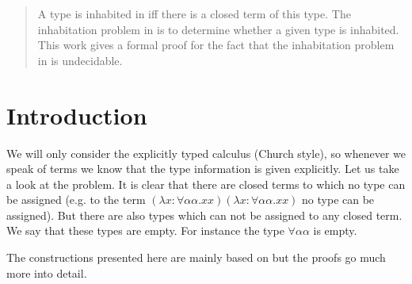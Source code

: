 \begin{abstract}
A \lambdaTwo{} type is inhabited in \lambdaTwo{} iff there is a closed \lambdaTwo{} term of this type. The inhabitation problem in \lambdaTwo{} is to determine whether a given \lambdaTwo{} type is inhabited. This work gives a formal proof for the fact that the inhabitation problem in \lambdaTwo{} is undecidable.
\end{abstract}

\section{Introduction}\label{sec.1}
We will only consider the explicitly typed \lambdaTwo{} calculus (Church style), so whenever we speak of \lambdaTwo{} terms we know that the type information is given explicitly. 
Let us take a look at the problem. It is clear that there are closed \lambdaTwo{} terms to which no \lambdaTwo{} type can be assigned (e.g. to the term $(\lambda x:\forall\alpha\alpha.xx)(\lambda x:\forall\alpha\alpha.xx)$ no type can be assigned). But there are also \lambdaTwo{} types which can not be assigned to any closed \lambdaTwo{} term. We say that these types are empty. For instance the \lambdaTwo{} type $\forall\alpha\alpha$ is empty.


The constructions presented here are mainly based on \cite{2} but the proofs go much more into detail.

